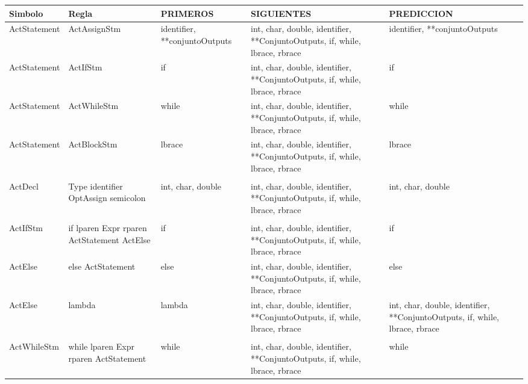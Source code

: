 \begin{tabularx}{\textwidth}{BBBBB}
          \toprule
          Simbolo & Regla & PRIMEROS & SIGUIENTES & PREDICCION \\
          \midrule
          ActStatement & ActAssignStm & identifier, **conjuntoOutputs & int, char, double, identifier, **ConjuntoOutputs, if, while, lbrace, rbrace & identifier, **conjuntoOutputs \\
               ActStatement & ActIfStm & if    & int, char, double, identifier, **ConjuntoOutputs, if, while, lbrace, rbrace & if \\
               ActStatement & ActWhileStm & while & int, char, double, identifier, **ConjuntoOutputs, if, while, lbrace, rbrace & while \\
               ActStatement & ActBlockStm & lbrace & int, char, double, identifier, **ConjuntoOutputs, if, while, lbrace, rbrace & lbrace \\
                     &       &       &       &  \\
               ActDecl & Type identifier OptAssign semicolon & int, char, double & int, char, double, identifier, **ConjuntoOutputs, if, while, lbrace, rbrace & int, char, double \\
                     &       &       &       &  \\
               ActIfStm & if lparen Expr rparen ActStatement ActElse & if    & int, char, double, identifier, **ConjuntoOutputs, if, while, lbrace, rbrace & if \\
               ActElse & else ActStatement & else  & int, char, double, identifier, **ConjuntoOutputs, if, while, lbrace, rbrace & else \\
               ActElse & lambda & lambda & int, char, double, identifier, **ConjuntoOutputs, if, while, lbrace, rbrace & int, char, double, identifier, **ConjuntoOutputs, if, while, lbrace, rbrace \\
                     &       &       &       &  \\
               ActWhileStm & while lparen Expr rparen ActStatement & while & int, char, double, identifier, **ConjuntoOutputs, if, while, lbrace, rbrace & while \\

           \bottomrule
               \end{tabularx}%


